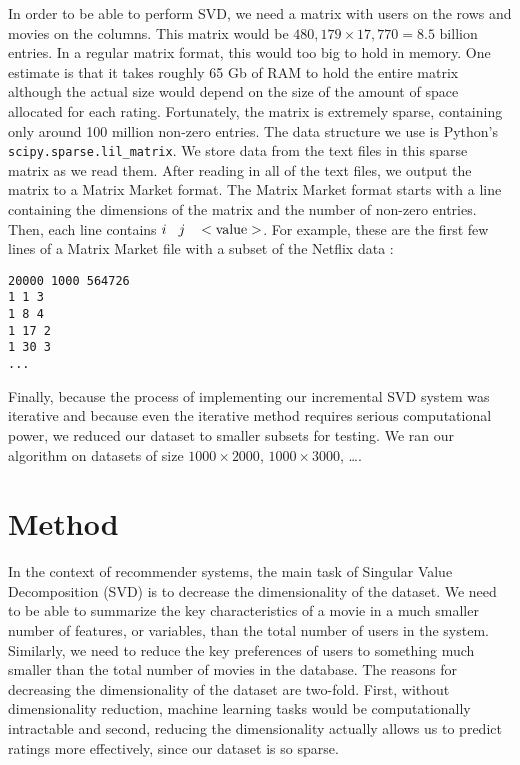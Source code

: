 \documentclass{article} %
\begin{document}
In order to be able to perform SVD, we need a matrix with users on the rows and movies on the columns.
This matrix would be $480,179 \times 17,770 = 8.5 \textrm{ billion}$ entries.
In a regular matrix format, this would too big to hold in memory. One estimate is that it takes roughly 65 Gb of RAM to hold the entire matrix \citep{revoR} although the actual size would depend on the size of the amount of space allocated for each rating.
Fortunately, the matrix is extremely sparse, containing only around 100 million non-zero entries.
The data structure we use is Python's \verb!scipy.sparse.lil_matrix!.
We store data from the text files in this sparse matrix as we read them.
After reading in all of the text files, we output the matrix to a Matrix Market format.
The Matrix Market format starts with a line containing the dimensions of the matrix and the number of non-zero entries.
Then, each line contains $i \hspace{2ex} j \hspace{2ex} <\textrm{value}>$.
For example, these are the first few lines of a Matrix Market file with a subset of the Netflix data :

\begin{verbatim}
20000 1000 564726
1 1 3
1 8 4
1 17 2
1 30 3
...
\end{verbatim}

Finally, because the process of implementing our incremental SVD system was iterative and because even the iterative method requires serious computational power, we reduced our dataset to smaller subsets for testing.
We ran our algorithm on datasets of size $1000 \times 2000$, $1000 \times 3000$, \ldots.

\section{Method}

In the context of recommender systems, the main task of Singular Value Decomposition (SVD) is to decrease the dimensionality of the dataset.
We need to be able to summarize the key characteristics of a movie in a much smaller number of features, or variables, than the total number of users in the system.
Similarly, we need to reduce the key preferences of users to something much smaller than the total number of movies in the database.
The reasons for decreasing the dimensionality of the dataset are two-fold.
First, without dimensionality reduction, machine learning tasks would be computationally intractable and second, reducing the dimensionality actually allows us to predict ratings more effectively, since our dataset is so sparse.
\end{document}
